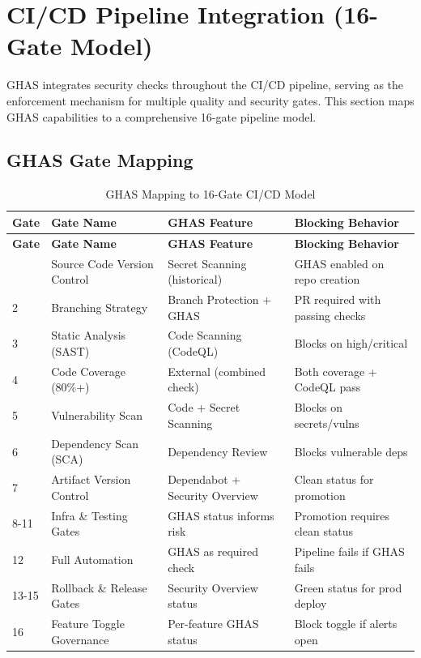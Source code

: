 \documentclass[11pt]{article}
\begin{document}
\section{CI/CD Pipeline Integration (16-Gate Model)}

GHAS integrates security checks throughout the CI/CD pipeline, serving as the enforcement mechanism for multiple quality and security gates. This section maps GHAS capabilities to a comprehensive 16-gate pipeline model.

\subsection{GHAS Gate Mapping}

\begin{longtable}{p{}p{}p{}p{}}
\caption{GHAS Mapping to 16-Gate CI/CD Model}\label{tab:gate_mapping}\\
\toprule
\textbf{Gate} & \textbf{Gate Name} & \textbf{GHAS Feature} & \textbf{Blocking Behavior} \\
\midrule
\endfirsthead
\toprule
\textbf{Gate} & \textbf{Gate Name} & \textbf{GHAS Feature} & \textbf{Blocking Behavior} \\
\midrule
\endhead
\bottomrule
\endfoot
1 & Source Code Version Control & Secret Scanning (historical) & GHAS enabled on repo creation \\
2 & Branching Strategy & Branch Protection + GHAS & PR required with passing checks \\
3 & Static Analysis (SAST) & Code Scanning (CodeQL) & Blocks on high/critical \\
4 & Code Coverage (80\%+) & External (combined check) & Both coverage + CodeQL pass \\
5 & Vulnerability Scan & Code + Secret Scanning & Blocks on secrets/vulns \\
6 & Dependency Scan (SCA) & Dependency Review & Blocks vulnerable deps \\
7 & Artifact Version Control & Dependabot + Security Overview & Clean status for promotion \\
8-11 & Infra \& Testing Gates & GHAS status informs risk & Promotion requires clean status \\
12 & Full Automation & GHAS as required check & Pipeline fails if GHAS fails \\
13-15 & Rollback \& Release Gates & Security Overview status & Green status for prod deploy \\
16 & Feature Toggle Governance & Per-feature GHAS status & Block toggle if alerts open \\
\end{longtable}
\end{document}
